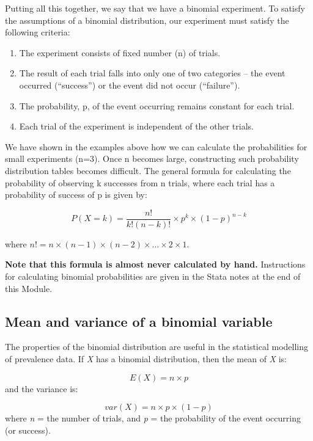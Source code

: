 \documentclass[
]{memoir}
\providecommand{\tightlist}{%
  \setlength{\itemsep}{0pt}\setlength{\parskip}{0pt}}
\begin{document}
Putting all this together, we say that we have a binomial experiment. To satisfy the assumptions of a binomial distribution, our experiment must satisfy the following criteria:

\begin{enumerate}
\def\labelenumi{\arabic{enumi}.}
\tightlist
\item
  The experiment consists of fixed number (n) of trials.
\item
  The result of each trial falls into only one of two categories -- the event occurred (``success'') or the event did not occur (``failure'').
\item
  The probability, p, of the event occurring remains constant for each trial.
\item
  Each trial of the experiment is independent of the other trials.
\end{enumerate}

We have shown in the examples above how we can calculate the probabilities for small experiments (n=3). Once n becomes large, constructing such probability distribution tables becomes difficult. The general formula for calculating the probability of observing k successes from n trials, where each trial has a probability of success of p is given by:

\[ P(X=k) = \frac{n!}{k! (n-k)!} \times p^k \times (1-p)^{n-k} \]

where \(n! = n \times (n-1) \times (n-2) \times \dots \times 2 \times 1\).

\textbf{Note that this formula is almost never calculated by hand.} Instructions for calculating binomial probabilities are given in the Stata notes at the end of this Module.

\hypertarget{mean-and-variance-of-a-binomial-variable}{%
\subsection{Mean and variance of a binomial variable}\label{mean-and-variance-of-a-binomial-variable}}

The properties of the binomial distribution are useful in the statistical modelling of prevalence data. If \emph{X} has a binomial distribution, then the mean of \emph{X} is:

\[ E(X) = n \times p\]
and the variance is:

\[ var(X) = n \times p \times (1-p) \]
where \emph{n} = the number of trials, and \emph{p} = the probability of the event occurring (or success).
\end{document}

